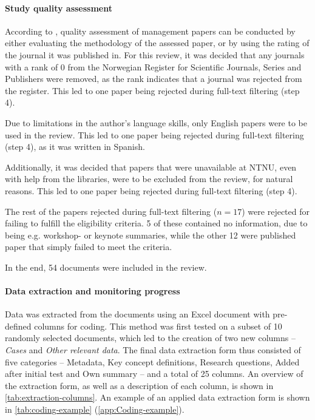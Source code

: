 \paragraph{Study quality assessment}
According to \textcite{Tranfield_2003}, quality assessment of management papers can be conducted by either evaluating the methodology of the assessed paper, or by using the rating of the journal it was published in. For this review, it was decided that any journals with a rank of 0 from the Norwegian Register for Scientific Journals, Series and Publishers \parencite{kanalregisteret} were removed, as the rank indicates that a journal was rejected from the register. This led to one paper being rejected during full-text filtering (step 4).

Due to limitations in the author's language skills, only English papers were to be used in the review. This led to one paper being rejected during full-text filtering (step 4), as it was written in Spanish.

Additionally, it was decided that papers that were unavailable at NTNU, even with help from the libraries, were to be excluded from the review, for natural reasons. This led to one paper being rejected during full-text filtering (step 4).

The rest of the papers rejected during full-text filtering ($n = 17$) were rejected for failing to fulfill the eligibility criteria. 5 of these contained no information, due to being e.g. workshop- or keynote summaries, while the other 12 were published paper that simply failed to meet the criteria.

In the end, 54 documents were included in the review.

\paragraph{Data extraction and monitoring progress}
Data was extracted from the documents using an Excel document with pre-defined columns for coding. This method was first tested on a subset of 10 randomly selected documents, which led to the creation of two new columns -- \textit{Cases} and \textit{Other relevant data}. The final data extraction form thus consisted of five categories -- Metadata, Key concept definitions, Research questions, Added after initial test and Own summary -- and a total of 25 columns. An overview of the extraction form, as well as a description of each column, is shown in \autoref{tab:extraction-columns}. An example of an applied data extraction form is shown in \autoref{tab:coding-example} (\autoref{app:Coding-example}).

